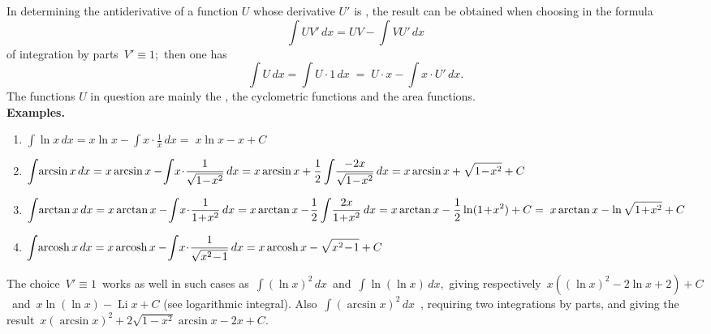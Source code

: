 \documentclass[12pt]{article}
\theoremstyle{definition}
\DeclareMathOperator{\arcosh}{arcosh}
\DeclareMathOperator{\Li}{Li}
\begin{document}
In determining the antiderivative of a  function $U$ whose derivative $U'$ is , the result can be obtained when choosing in the formula 
             $$\int UV'\,dx = UV-\!\int VU'\,dx$$
of integration by parts \,$V' \equiv 1$;\, then one has
          $$\int U\,dx = \int U\!\cdot\!1\,dx\; =\; U\!\cdot\!x-\!\int x\!\cdot\!U'\,dx.$$ 
The functions $U$ in question are mainly the , the cyclometric functions and the area functions.\\ 

\textbf{Examples.}    
\begin{enumerate}
\item $\displaystyle\int\!\ln{x}\,dx = x\ln{x}-\!\int x\!\cdot\!\frac{1}{x}\,dx =\; x\ln{x}-x+C$
\item $\displaystyle\int\!\arcsin{x}\,dx = x\arcsin{x}-\!\int\!x\!\cdot\!\frac{1}{\sqrt{1\!-\!x^2}}\,dx = 
x\arcsin{x}+\frac{1}{2}\int\!\frac{-2x}{\sqrt{1\!-\!x^2}}\,dx\\ = x\arcsin{x}+\sqrt{1\!-\!x^2}+C$
\item $\displaystyle\int\!\arctan{x}\,dx = x\arctan{x}-\!\int\!x\!\cdot\!\frac{1}{1\!+\!x^2}\,dx = 
x\arctan{x}-\!\frac{1}{2}\int\!\frac{2x}{1\!+\!x^2}\,dx\\ = x\arctan{x}-\frac{1}{2}\ln(1\!+\!x^2)+C
=\; x\arctan{x}-\ln\sqrt{1\!+\!x^2}+C$
\item $\displaystyle\int\!\arcosh{x}\,dx = x\arcosh{x}-\!\int\!x\!\cdot\!\frac{1}{\sqrt{x^2\!-\!1}}\,dx \\=
x\arcosh{x}-\sqrt{x^2\!-\!1}+C$
\end{enumerate}

The choice\, $V' \equiv 1$\, works as well in such cases as\, $\int(\ln{x})^2\,dx$\, and\, $\int\ln(\ln{x})\,dx$,\, giving respectively\, $x((\ln{x})^2-2\ln{x}+2)+C$\, and\, $x\ln(\ln{x})-\Li{x}+C$ (see logarithmic integral).  Also\, 
$\int(\arcsin{x})^2\,dx$\, , requiring two integrations by parts, and giving the result\, $x(\arcsin{x})^2+2\sqrt{1\!-\!x^2}\arcsin{x}-2x+C$.
\end{document}

